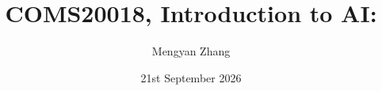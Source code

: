 \usepackage{amsmath, amssymb, graphicx}
\usepackage[]{algorithm2e}
\usepackage{pdfpages}
\usepackage{bm}
\usepackage{relsize}
\usepackage[british]{babel}
\usepackage{tikz,tikzsymbols}
\usepackage{hyperref}
\usepackage{cancel}
\usepackage{caption,subcaption}
\usepackage{adjustbox}
\usepackage{overpic}
\usepackage[UKenglish]{isodate}
\usepackage{tabularx}
\usepackage{array}
\usepackage{booktabs}

\usetikzlibrary{arrows,decorations.markings,positioning,calc,shapes.multipart}

\newcommand{\bs}{\boldsymbol}


\hypersetup{colorlinks,linkcolor=,urlcolor=blue}
\newenvironment{titledslide}[1]{\begin{frame}\frametitle{#1}}{\end{frame}}



\author{Mengyan Zhang}

\title{COMS20018, Introduction to AI:\\ \vspace{5pt} \lecttitle}

\date{21st September 2026}

